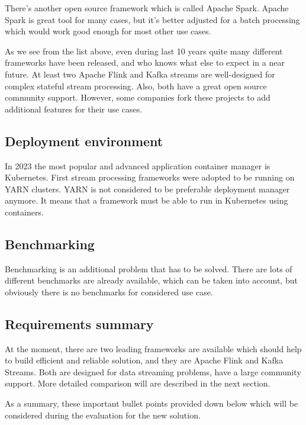 There's another open source framework which is called Apache Spark.
Apache Spark is great tool for many cases, but it's better adjusted
for a batch processing which would work good enough for most other use cases.

As we see from the list above, even during last 10 years quite many different frameworks have
been released, and who knows what else to expect in a near future.
At least two Apache Flink and Kafka streams are well-designed for
complex stateful stream processing.
Also, both have a great open source community support.
However, some companies fork these projects to add additional features for their use cases.

\subsection{Deployment environment}\label{subsec:deployment-environment}
In 2023 the most popular and advanced application container manager is Kubernetes.
First stream processing frameworks were adopted to be running on YARN clusters.
YARN is not considered to be preferable deployment manager anymore.
It means that a framework must be able to run in Kubernetes using containers.


\subsection{Benchmarking}\label{subsec:bench}
Benchmarking is an additional problem that has to be solved.
There are lots of different benchmarks are already available, which can
be taken into account, but obviously there is no benchmarks for considered use case.

\subsection{Requirements summary}\label{subsec:final-requirements}
At the moment, there are two leading frameworks are available which
should help to build efficient and reliable solution, and
they are Apache Flink and Kafka Streams.
Both are designed for data streaming problems, have a large community support.
More detailed comparison will are described in the next section.

As a summary, these important bullet points provided down below which will
be considered during the evaluation for the new solution.

